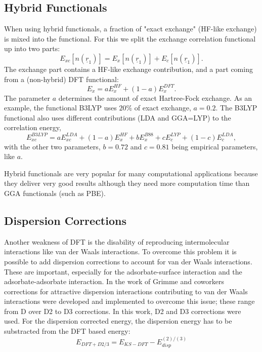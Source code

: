 \documentclass[11pt,DIV=13,BCOR=5mm,a4paper,headinclude]{scrbook}
\renewcommand{\vec}[1]{\underline{#1}}
\begin{document}
\subsection{Hybrid Functionals}
When using hybrid functionals, a fraction of "exact exchange" (HF-like exchange) is mixed into the functional.
For this we split the exchange correlation functional up into two parts:
\begin{equation}
 E_{xc}[n(\vec{r}_1)]=  E_{x}[n(\vec{r}_1)] + E_{c}[n(\vec{r}_1)].
\end{equation}
The exchange part contains a HF-like exchange contribution, and a part coming from a (non-hybrid) DFT functional:
\begin{equation}
 E_x = aE_x^{HF} + (1-a)E_x^{DFT}.
\end{equation}
The parameter $a$ determines the amount of exact Hartree-Fock exchange.
As an example, the functional B3LYP uses $20\%$ of exact exchange\cite{Becke1993}, $a=0.2$.
The B3LYP functional also uses different contributions (LDA and GGA=LYP) to the correlation energy,
\begin{equation}
 E_{xc}^{B3LYP}= aE_{xc}^{LDA} + (1-a)E_x^{HF} + bE_x^{B88} + cE_c^{LYP} + (1-c)E_c^{LDA},
\end{equation}
with the other two parameters, $b=0.72$ and $c=0.81$ being empirical parameters, like $a$.


Hybrid functionals are very popular for many computational applications because they deliver very good results although they need more computation time than GGA functionals (such as PBE).

\subsection{Dispersion Corrections}
Another weakness of DFT is the disability of reproducing intermolecular interactions like van der Waals interactions.
To overcome this problem it is possible to add dispersion corrections to account for van der Waals interactions.
These are important, especially for the adsorbate-surface interaction and the adsorbate-adsorbate interaction.
In the work of Grimme\cite{grimme06} and coworkers corrections for attractive dispersion interactions contributing to van der Waals interactions were developed and implemented to overcome this issue; these range from D over D2 to D3 corrections.
In this work, D2 and D3 corrections were used.
For the dispersion corrected energy, the dispersion energy has to be substracted from the DFT based energy:
\begin{equation}
E_{DFT+D2/3}=E_{KS-DFT} - E_{disp}^{(2)/(3)}
\end{equation}
\end{document}
